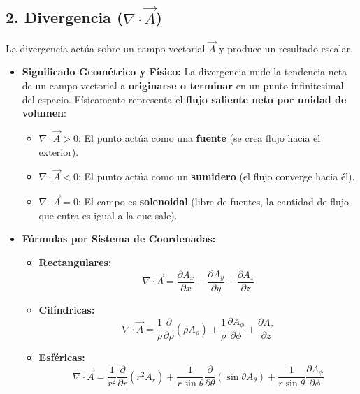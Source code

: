 \documentclass[11pt, a4paper]{article}
\begin{document}
\vspace{0.3cm}

\subsection{2. Divergencia ($\nabla \cdot \vec{A}$)}

La divergencia actúa sobre un campo vectorial $\vec{A}$ y produce un resultado escalar.

\begin{itemize}
    \item \textbf{Significado Geométrico y Físico:}
    La divergencia mide la tendencia neta de un campo vectorial a \textbf{originarse o terminar} en un punto infinitesimal del espacio. Físicamente representa el \textbf{flujo saliente neto por unidad de volumen}:
    \begin{itemize}
        \item $\nabla \cdot \vec{A} > 0$: El punto actúa como una \textbf{fuente} (se crea flujo hacia el exterior).
        \item $\nabla \cdot \vec{A} < 0$: El punto actúa como un \textbf{sumidero} (el flujo converge hacia él).
        \item $\nabla \cdot \vec{A} = 0$: El campo es \textbf{solenoidal} (libre de fuentes, la cantidad de flujo que entra es igual a la que sale).
    \end{itemize}
    
    \item \textbf{Fórmulas por Sistema de Coordenadas:}
    \begin{itemize}
        \item \textbf{Rectangulares:}
        $$\nabla \cdot \vec{A} = \frac{\partial A_x}{\partial x} + \frac{\partial A_y}{\partial y} + \frac{\partial A_z}{\partial z}$$
        
        \item \textbf{Cilíndricas:}
        $$\nabla \cdot \vec{A} = \frac{1}{\rho}\frac{\partial}{\partial \rho}(\rho A_\rho) + \frac{1}{\rho}\frac{\partial A_\phi}{\partial \phi} + \frac{\partial A_z}{\partial z}$$
        
        \item \textbf{Esféricas:}
        $$\nabla \cdot \vec{A} = \frac{1}{r^2}\frac{\partial}{\partial r}(r^2 A_r) + \frac{1}{r\sin\theta}\frac{\partial}{\partial \theta}(\sin\theta A_\theta) + \frac{1}{r\sin\theta}\frac{\partial A_\phi}{\partial \phi}$$
    \end{itemize}
\end{itemize}
\end{document}
